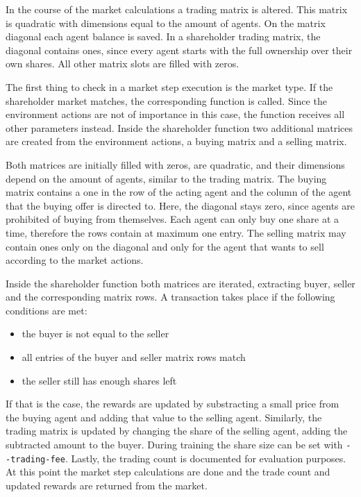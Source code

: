 In the course of the market calculations a trading matrix is altered. This matrix is quadratic with dimensions equal to the amount of agents. On the matrix diagonal each agent balance is saved. In a shareholder trading matrix, the diagonal contains ones, since every agent starts with the full ownership over their own shares. All other matrix slots are filled with zeros.

The first thing to check in a market step execution is the market type. If the shareholder market matches, the corresponding function is called. Since the environment actions are not of importance in this case, the function receives all other parameters instead. Inside the shareholder function two additional matrices are created from the environment actions, a buying matrix and a selling matrix.

Both matrices are initially filled with zeros, are quadratic, and their dimensions depend on the amount of agents, similar to the trading matrix. The buying matrix contains a one in the row of the acting agent and the column of the agent that the buying offer is directed to. Here, the diagonal stays zero, since agents are prohibited of buying from themselves. Each agent can only buy one share at a time, therefore the rows contain at maximum one entry. The selling matrix may contain ones only on the diagonal and only for the agent that wants to sell according to the market actions.

Inside the shareholder function both matrices are iterated, extracting buyer, seller and the corresponding matrix rows. A transaction takes place if the following conditions are met:
\begin{itemize}
    \item the buyer is not equal to the seller
    \item all entries of the buyer and seller matrix rows match
    \item the seller still has enough shares left
\end{itemize}

If that is the case, the rewards are updated by substracting a small price from the buying agent and adding that value to the selling agent. Similarly, the trading matrix is updated by changing the share of the selling agent, adding the subtracted amount to the buyer. During training the share size can be set with \verb|--trading-fee|. Lastly, the trading count is documented for evaluation purposes. At this point the market step calculations are done and the trade count and updated rewards are returned from the market.

